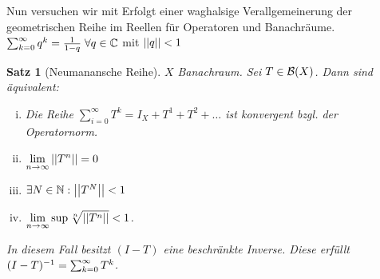 \documentclass[ngerman]{report}
\theoremstyle{plain}%
\newtheorem{thm}{Satz}[chapter]
\theoremstyle{definition}%
\theoremstyle{myStyle}
\begin{document}
Nun versuchen wir mit Erfolgt einer waghalsige Verallgemeinerung der geometrischen Reihe im Reellen für Operatoren und Banachräume. 
	$\sum_{k=0}^\infty q^k = \frac{1}{1-q} \; \forall q\in\mathbb{C}$ mit $\left\lvert \left\lvert q \right\rvert \right\rvert < 1$
	\begin{thm}[Neumanansche Reihe] 
		$X$ Banachraum. Sei $T\in \mathcal{B}(X)$. Dann sind äquivalent: 
			\begin{enumerate}[i)]
				\item Die Reihe $ \sum_{i=0}^\infty T^k = I_X + T^1 + T^2 + \dots$ ist konvergent bzgl. der Operatornorm.
				\item $\displaystyle \lim_{n \to \infty} \left\lvert \left\lvert T^n \right\rvert \right\rvert = 0$
				\item $\exists N\in \mathbb{N}: \left\lvert \left\lvert T^N \right\rvert \right\rvert < 1$
				\item $\displaystyle \lim_{n \to \infty} \sup \sqrt[n]{\left\lvert \left\lvert T^n \right\rvert \right\rvert} < 1$. 
			\end{enumerate}
		In diesem Fall besitzt $(I-T)$ eine beschränkte Inverse.
		Diese erfüllt $(I-T)^{-1} = \sum_{k=0}^\infty T^k$.
	\end{thm}
\end{document}
